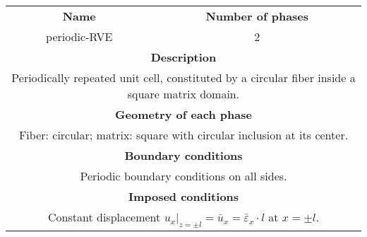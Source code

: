 \begin{table}[htbp]
\footnotesize
  \centering
  \small
    \begin{tabularx}{\textwidth}{cc}
    \toprule
    \midrule
    \textbf{Name} & \textbf{Number of phases}\\
     periodic-RVE&2\\
    \midrule
    \multicolumn{2}{X}{\textbf{Description}}\\
    \multicolumn{2}{X}{Periodically repeated unit cell, constituted by a circular fiber inside a square matrix domain.}\\
    \midrule
    \multicolumn{2}{X}{\textbf{Geometry of each phase}}\\
    \multicolumn{2}{X}{Fiber: circular; matrix: square with circular inclusion at its center.}\\
    \midrule
    \multicolumn{2}{X}{\textbf{Boundary conditions}}\\
    \multicolumn{2}{X}{Periodic boundary conditions on all sides.}\\
    \midrule
    \multicolumn{2}{X}{\textbf{Imposed conditions}}\\
    \multicolumn{2}{X}{Constant displacement $u_{x}|_{z=\pm l}=\bar{u}_{x}=\bar{\varepsilon}_{x}\cdot l$ at $x=\pm l$.}\\
    \midrule
    \bottomrule
    \end{tabularx}%
  \label{tab:geom_tab3}%
\end{table}%